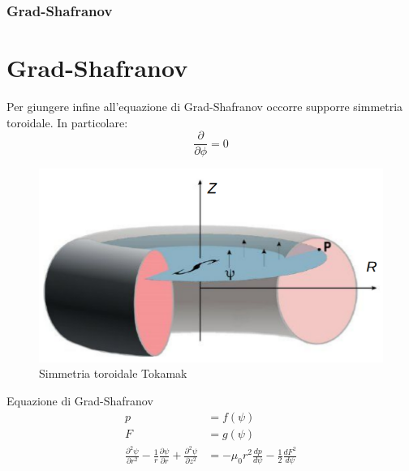 \documentclass{beamer}
\begin{document}
\begin{frame}
	\frametitle{Grad-Shafranov}
	\section{Grad-Shafranov}
	\begin{minipage}[t]{0.50\textwidth}
		Per giungere infine all'equazione di Grad-Shafranov occorre supporre simmetria toroidale. In particolare:
		\begin{equation*}
			\frac{\partial}{\partial \phi}=0
		\end{equation*}

	\end{minipage}
	\begin{minipage}[t]{0.40\textwidth}
		\begin{figure}
			\includegraphics[scale=0.25]{2022-06-07-13-08-40.png}%
			\caption{Simmetria toroidale Tokamak}
		\end{figure}
	\end{minipage}
	\begin{block}{Equazione di Grad-Shafranov}
		\begin{align*}
			p                                                                                                                           & =f(\psi)                                                          \\
			F                                                                                                                           & =g(\psi)                                                          \\
			\frac{\partial^{2}\psi}{\partial r^{2}}-\frac{1}{r}\frac{\partial \psi}{\partial r}+\frac{\partial^{2}\psi}{\partial z^{2}} & =-\mu_{0}r^{2}\frac{d p}{d \psi}-\frac{1}{2}\frac{d F^{2}}{d\psi}
		\end{align*}
	\end{block}

\end{frame}
\end{document}
